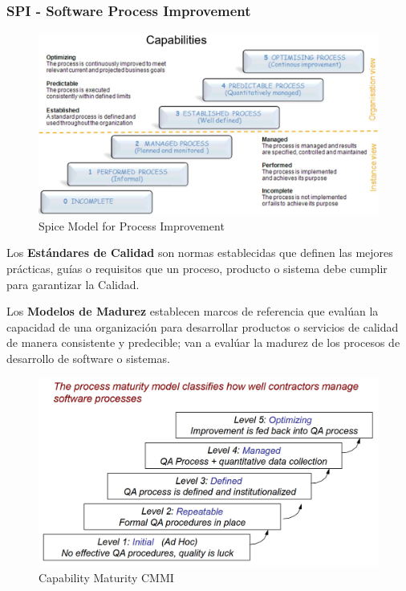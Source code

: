 \subsubsection{SPI - Software Process Improvement}

\begin{figure}[htbp]
   \centering
   \includegraphics{images/01/spice.png}
   \caption{Spice Model for Process Improvement}
   \label{fig:01/spice}
\end{figure}

\begin{paracol}{2}
   \colfill
   Los \textbf{Estándares de Calidad} son normas establecidas que definen las mejores prácticas, guías o requisitos que un proceso, producto o sistema debe cumplir para garantizar la Calidad.

   Los \textbf{Modelos de Madurez} establecen marcos de referencia que evalúan la capacidad de una organización para desarrollar productos o servicios de calidad de manera consistente y predecible; van a evalúar la madurez de los procesos de desarrollo de software o sistemas.
   \colfill
   
   \switchcolumn

   \begin{figure}[htbp]
      \centering
      \includegraphics{images/01/madurez.png}
      \caption{Capability Maturity CMMI}
      \label{fig:01/madurez}
   \end{figure}

\end{paracol}

